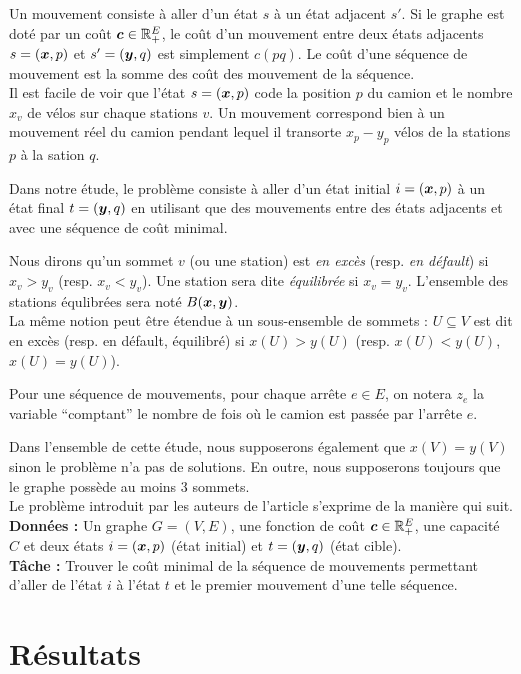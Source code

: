 \documentclass[twoside,11pt,openany,a4paper]{rapport}
\begin{document}
Un mouvement consiste à aller d'un état $s$ à un état adjacent $s'$. Si le graphe est doté par un coût $\boldsymbol{c} \in \mathbb{R}^E_+$, le coût d'un mouvement entre deux états adjacents $s=(\boldsymbol{x},p)$ et $s'=(\boldsymbol{y},q)$ est simplement $c(pq)$. Le coût d'une séquence de mouvement est la somme des coût des mouvement de la séquence.
\\

Il est facile de voir que l'état $s=(\boldsymbol{x},p)$ code la position $p$ du camion et le nombre $x_v$ de vélos sur chaque stations $v$. Un mouvement correspond bien à un mouvement réel du camion pendant lequel il transorte $x_p-y_p$ vélos de la stations $p$ à la sation $q$.

Dans notre étude, le problème consiste à aller d'un état initial $i=(\boldsymbol{x},p)$ à un état final $t=(\boldsymbol{y},q)$ en utilisant que des mouvements entre des états adjacents et avec une séquence de coût minimal.

Nous dirons qu'un sommet $v$ (ou une station) est \emph{en excès} (resp. \emph{en défault}) si $x_v > y_v$ (resp. $x_v < y_v$). Une station sera dite \emph{équilibrée} si $x_v=y_v$. L'ensemble des stations équlibrées sera noté $B(\boldsymbol{x},\boldsymbol{y})$.
\\
La même notion peut être étendue à un sous-ensemble de sommets : $U \subseteq V$ est dit en excès (resp. en défault, équilibré) si $x(U) > y(U)$ (resp. $x(U) < y(U)$, $x(U) = y(U)$).

Pour une séquence de mouvements, pour chaque arrête $e \in E$, on notera $z_e$ la variable ``comptant'' le nombre de fois où le camion est passée par l'arrête $e$.

Dans l'ensemble de cette étude, nous supposerons également que $x(V) = y(V)$ sinon le problème n'a pas de solutions. En outre, nous supposerons toujours que le graphe possède au moins 3 sommets.
\\

Le problème introduit par les auteurs de l'article \cite{Benchimol2011} s'exprime de la manière qui suit.
\\
\textbf{Données :} Un graphe $G=(V,E)$, une fonction de coût $\boldsymbol{c} \in \mathbb{R}^E_+$, une capacité $C$ et deux états $i=(\boldsymbol{x},p)$ (état initial) et $t=(\boldsymbol{y},q)$ (état cible).
\\
\textbf{Tâche :} Trouver le coût minimal de la séquence de mouvements permettant d'aller de l'état $i$ à l'état $t$ et le premier mouvement d'une telle séquence.

\section{Résultats}
\end{document}

